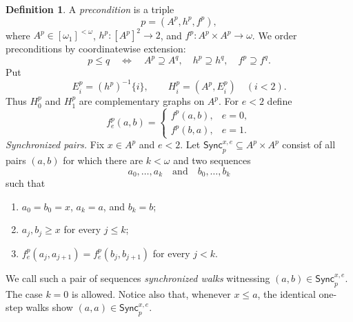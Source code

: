 \documentclass[10pt,a4paper]{amsart}
\numberwithin{equation}{section}
\theoremstyle{definition}
\newtheorem{definition}[theorem]{Definition}
\theoremstyle{remark}
\begin{document}
\begin{definition}\label{def:preconditions}
A \emph{precondition} is a triple
\begin{displaymath}
 p=(A^p,h^p,f^p),
\end{displaymath}
where $A^p\in[\omega_1]^{<\omega}$,
$h^p:[A^p]^2\to 2$, and $f^p:A^p\times A^p\to\omega$.
We order preconditions by coordinatewise extension:
\begin{displaymath}
 p\leq q
 \quad\Longleftrightarrow\quad
 A^p\supseteq A^q,\quad h^p\supseteq h^q,\quad
 f^p\supseteq f^q.
\end{displaymath}
Put
\begin{displaymath}
 E_i^p=(h^p)^{-1}\{i\},\qquad H_i^p=(A^p,E_i^p)
 \quad(i<2).
\end{displaymath}
Thus $H_0^p$ and $H_1^p$ are complementary graphs on $A^p$.
For $e<2$ define
\begin{displaymath}
 f_e^p(a,b)=
 \begin{cases}
 f^p(a,b),&e=0,\\
 f^p(b,a),&e=1.
 \end{cases}
\end{displaymath}
\smallskip
\noindent\emph{Synchronized pairs.}
Fix $x\in A^p$ and $e<2$.  Let
$\mathsf{Sync}^{x,e}_p\subseteq A^p\times A^p$ consist of all pairs
$(a,b)$ for which there are $k<\omega$ and two sequences
\begin{displaymath}
 a_0,\ldots,a_k\quad\text{and}\quad b_0,\ldots,b_k
\end{displaymath}
such that
\begin{enumerate}
\item $a_0=b_0=x$, $a_k=a$, and $b_k=b$;
\item $a_j,b_j\geq x$ for every $j\leq k$;
\item
$f_e^p(a_j,a_{j+1})=f_e^p(b_j,b_{j+1})$ for every $j<k$.
\end{enumerate}
We call such a pair of sequences \emph{synchronized walks} witnessing
$(a,b)\in\mathsf{Sync}^{x,e}_p$.
The case $k=0$ is allowed.  Notice also that, whenever $x\leq a$,
the identical one-step walks show
$(a,a)\in\mathsf{Sync}^{x,e}_p$.

\begin{figure}[ht]
\centering
{}
\end{figure}
\end{definition}
\end{document}
